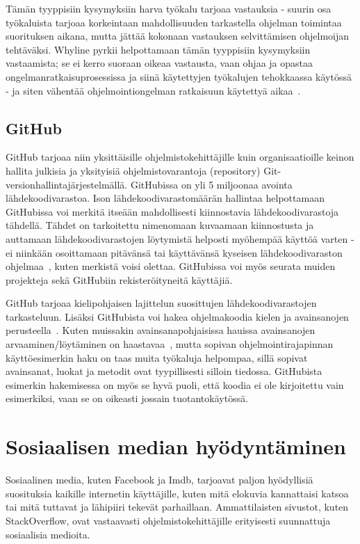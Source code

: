 \documentclass[finnish]{tktltiki2}
\theoremstyle{definition}
\theoremstyle{remark}
\begin{document}
Tämän tyyppisiin kysymyksiin harva työkalu tarjoaa vastauksia - suurin osa työkaluista tarjoaa korkeintaan mahdollisuuden tarkastella ohjelman toimintaa suorituksen aikana, mutta jättää kokonaan vastauksen selvittämisen ohjelmoijan tehtäväksi.
Whyline pyrkii helpottamaan tämän tyyppisiin kysymyksiin vastaamista; se ei kerro suoraan oikeaa vastausta, vaan ohjaa ja opastaa ongelmanratkaisuprosessissa ja siinä käytettyjen työkalujen tehokkaassa käytössä - ja siten vähentää ohjelmointiongelman ratkaisuun käytettyä aikaa~\cite{whyline}.

\subsection{GitHub}
GitHub tarjoaa niin yksittäisille ohjelmistokehittäjille kuin organisaatioille keinon hallita julkisia ja yksityisiä ohjelmistovarantoja (repository) Git-versionhallintajärjestelmällä. GitHubissa on yli 5 miljoonaa avointa lähdekoodivarastoa.
Ison lähdekoodivarastomäärän hallintaa helpottamaan GitHubissa voi merkitä itseään mahdollisesti kiinnostavia lähdekoodivarastoja tähdellä. Tähdet on tarkoitettu nimenomaan kuvaamaan kiinnostusta ja auttamaan lähdekoodivarastojen löytymistä helposti myöhempää käyttöä varten - ei niinkään osoittamaan pitävänsä tai käyttävänsä kyseisen lähdekoodivaraston ohjelmaa~\cite{social-networking-meets-se}, kuten merkistä voisi olettaa.
GitHubissa voi myös seurata muiden projekteja sekä GitHubiin rekisteröityneitä käyttäjiä.

GitHub tarjoaa kielipohjaisen lajittelun suosittujen lähdekoodivarastojen tarkasteluun. Lisäksi GitHubista voi hakea ohjelmakoodia kielen ja avainsanojen perusteella~\cite{social-networking-meets-se}. Kuten muissakin avainsanapohjaisissa hauissa avainsanojen arvaaminen/löytäminen on haastavaa~\cite{what-to-search-for}, mutta sopivan ohjelmointirajapinnan käyttöesimerkin haku on taas muita työkaluja helpompaa, sillä sopivat avainsanat, luokat ja metodit ovat tyypillisesti silloin tiedossa. GitHubista esimerkin hakemisessa on myös se hyvä puoli, että koodia ei ole kirjoitettu vain esimerkiksi, vaan se on oikeasti jossain tuotantokäytössä.

\section{Sosiaalisen median hyödyntäminen}
Sosiaalinen media, kuten Facebook ja Imdb, tarjoavat paljon hyödyllisiä suosituksia kaikille internetin käyttäjille, kuten mitä elokuvia kannattaisi katsoa tai mitä tuttavat ja lähipiiri tekevät parhaillaan. Ammattilaisten sivustot, kuten StackOverflow, ovat vastaavasti ohjelmistokehittäjille erityisesti suunnattuja sosiaalisia medioita.
\end{document}

